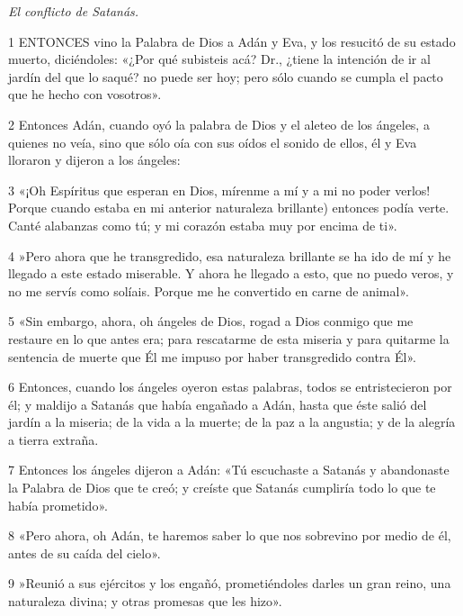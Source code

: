 \par \textit{El conflicto de Satanás.}

\par 1 ENTONCES vino la Palabra de Dios a Adán y Eva, y los resucitó de su estado muerto, diciéndoles: «¿Por qué subisteis acá? Dr., ¿tiene la intención de ir al jardín del que lo saqué? no puede ser hoy; pero sólo cuando se cumpla el pacto que he hecho con vosotros».

\par 2 Entonces Adán, cuando oyó la palabra de Dios y el aleteo de los ángeles, a quienes no veía, sino que sólo oía con sus oídos el sonido de ellos, él y Eva lloraron y dijeron a los ángeles:

\par 3 «¡Oh Espíritus que esperan en Dios, mírenme a mí y a mi no poder verlos! Porque cuando estaba en mi anterior naturaleza brillante) entonces podía verte. Canté alabanzas como tú; y mi corazón estaba muy por encima de ti».

\par 4 »Pero ahora que he transgredido, esa naturaleza brillante se ha ido de mí y he llegado a este estado miserable. Y ahora he llegado a esto, que no puedo veros, y no me servís como solíais. Porque me he convertido en carne de animal».

\par 5 «Sin embargo, ahora, oh ángeles de Dios, rogad a Dios conmigo que me restaure en lo que antes era; para rescatarme de esta miseria y para quitarme la sentencia de muerte que Él me impuso por haber transgredido contra Él».

\par 6 Entonces, cuando los ángeles oyeron estas palabras, todos se entristecieron por él; y maldijo a Satanás que había engañado a Adán, hasta que éste salió del jardín a la miseria; de la vida a la muerte; de la paz a la angustia; y de la alegría a tierra extraña.

\par 7 Entonces los ángeles dijeron a Adán: «Tú escuchaste a Satanás y abandonaste la Palabra de Dios que te creó; y creíste que Satanás cumpliría todo lo que te había prometido».

\par 8 «Pero ahora, oh Adán, te haremos saber lo que nos sobrevino por medio de él, antes de su caída del cielo».

\par 9 »Reunió a sus ejércitos y los engañó, prometiéndoles darles un gran reino, una naturaleza divina; y otras promesas que les hizo».

